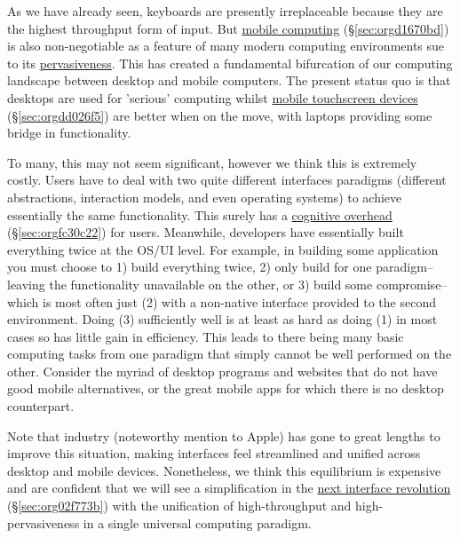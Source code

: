 \documentclass[logo,bsc,singlespacing,parskip]{infthesis}
\begin{document}
As we have already seen, keyboards are presently irreplaceable because they are the highest throughput form of input.
But \hyperref[sec:orgd1670bd]{mobile computing} (\S \ref{sec:orgd1670bd}) is also non-negotiable as a feature of many modern computing environments sue to its \hyperref[pervasiveness]{pervasiveness}.
This has created a fundamental bifurcation of our computing landscape between desktop and mobile computers.
The present status quo is that desktops are used for 'serious' computing whilst \hyperref[sec:orgdd026f5]{mobile touchscreen devices} (\S \ref{sec:orgdd026f5}) are better when on the move, with laptops providing some bridge in functionality.

To many, this may not seem significant, however we think this is extremely costly.
Users have to deal with two quite different interfaces paradigms (different abstractions, interaction models, and even operating systems) to achieve essentially the same functionality.
This surely has a \hyperref[sec:orgfc30c22]{cognitive overhead} (\S \ref{sec:orgfc30c22}) for users.
Meanwhile, developers have essentially built everything twice at the OS/UI level.
For example, in building some application you must choose to 1) build everything twice, 2) only build for one paradigm-- leaving the functionality unavailable on the other, or 3) build some compromise-- which is most often just (2) with a non-native interface provided to the second environment.
Doing (3) sufficiently well is at least as hard as doing (1) in most cases so has little gain in efficiency.
This leads to there being many basic computing tasks from one paradigm that simply cannot be well performed on the other.
Consider the myriad of desktop programs and websites that do not have good mobile alternatives, or the great mobile apps for which there is no desktop counterpart.

Note that industry (noteworthy mention to Apple) has gone to great lengths to improve this situation, making interfaces feel streamlined and unified across desktop and mobile devices.
Nonetheless, we think this equilibrium is expensive and are confident that we will see a simplification in the \hyperref[sec:org02f773b]{next interface revolution} (\S \ref{sec:org02f773b}) with the unification of high-throughput and high-pervasiveness in a single universal computing paradigm.
\end{document}
